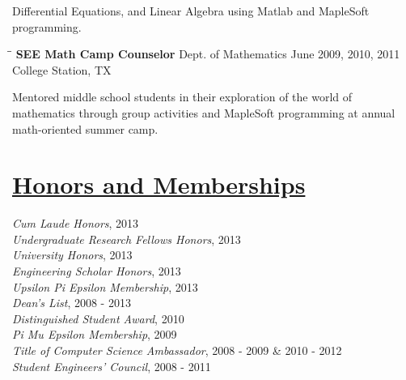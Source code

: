 \documentclass[8pt]{res}
\begin{document}
\begin{resume}
    Differential Equations, and Linear Algebra using Matlab and MapleSoft programming.
    \begin{tabbing}
      \hspace{2.3in}\= \hspace{2.6in}\= \kill %
      \textbf{SEE Math Camp Counselor}  \>Dept. of Mathematics \> June 2009, 2010, 2011\\ \>College Station, TX
    \end{tabbing}\vspace{-20pt}
    Mentored middle school students in their exploration of the world of\\
    mathematics through group activities and MapleSoft programming at annual\\
    math-oriented summer camp.


    \section{\underline{Honors and Memberships}}          
    \vspace{+0.02in}	
    \emph{Cum Laude Honors}, 2013 \\
    \emph{Undergraduate Research Fellows Honors}, 2013 \\
    \emph{University Honors}, 2013 \\
    \emph{Engineering Scholar Honors}, 2013 \\
    \emph{Upsilon Pi Epsilon Membership}, 2013 \\
    \emph{Dean's List}, 2008 - 2013 \\
    \emph{Distinguished Student Award}, 2010 \\
    \emph{Pi Mu Epsilon Membership}, 2009 \\
    \emph{Title of Computer Science Ambassador}, 2008 - 2009 \& 2010 - 2012 \\
    \emph{Student Engineers' Council}, 2008 - 2011 \\
    \vspace{-0.1in}	



\end{resume}
\end{document}
